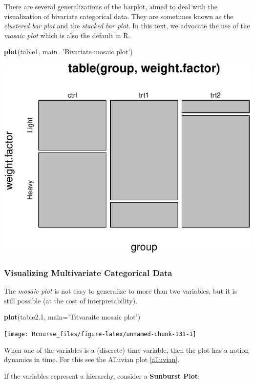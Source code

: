 \documentclass[]{book}
\newenvironment{Shaded}{\begin{snugshade}}{\end{snugshade}}
\newcommand{\KeywordTok}[1]{\textcolor[rgb]{0.13,0.29,0.53}{\textbf{#1}}}
\newcommand{\DataTypeTok}[1]{\textcolor[rgb]{0.13,0.29,0.53}{#1}}
\newcommand{\DecValTok}[1]{\textcolor[rgb]{0.00,0.00,0.81}{#1}}
\newcommand{\StringTok}[1]{\textcolor[rgb]{0.31,0.60,0.02}{#1}}
\newcommand{\NormalTok}[1]{#1}
\theoremstyle{definition}
\theoremstyle{definition}
\theoremstyle{definition}
\theoremstyle{remark}
\begin{document}
There are several generalizations of the barplot, aimed to deal with the
visualization of bivariate categorical data. They are sometimes known as
the \emph{clustered bar plot} and the \emph{stacked bar plot}. In this
text, we advocate the use of the \emph{mosaic plot} which is also the
default in R.

\begin{Shaded}
\begin{Highlighting}[]
\KeywordTok{plot}\NormalTok{(table1, }\DataTypeTok{main=}\StringTok{'Bivariate mosaic plot'}\NormalTok{)}
\end{Highlighting}
\end{Shaded}

\includegraphics[width=0.5\linewidth]{Rcourse_files/figure-latex/unnamed-chunk-130-1}

\subsubsection{Visualizing Multivariate Categorical
Data}\label{visualizing-multivariate-categorical-data}

The \emph{mosaic plot} is not easy to generalize to more than two
variables, but it is still possible (at the cost of interpretability).

\begin{Shaded}
\begin{Highlighting}[]
\KeywordTok{plot}\NormalTok{(table2.}\DecValTok{1}\NormalTok{, }\DataTypeTok{main=}\StringTok{'Trivaraite mosaic plot'}\NormalTok{)}
\end{Highlighting}
\end{Shaded}

\texttt{[image: Rcourse\_files/figure-latex/unnamed-chunk-131-1]}

When one of the variables is a (discrete) time variable, then the plot
has a notion dynamics in time. For this see the Alluvian plot
\ref{alluvian}.

If the variables represent a hierarchy, consider a \textbf{Sunburst
Plot}:
\end{document}
